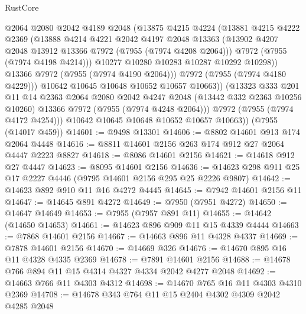 \begin{lexlean}{RustCore}
\begin{coremodule}
                  @2064
                  @2080
                  @2042
                  @4189
                  @2048
                  (@13875
                    @4215
                    @4224
                    (@13881
                      @4215
                      @4222
                      @2369
                      (@13888
                        @4214
                        @4221
                        @2042
                        @4197
                        @2048
                        @13363
                        (@13902 @4207 @2048 @13912 @13366 @7972 (@7955 (@7974 @4208 @2064)))
                        @7972
                        (@7955 (@7974 @4198 @4214)))
                      @10277
                      @10280
                      @10283
                      @10287
                      @10292
                      @10298))
                  @13366
                  @7972
                  (@7955 (@7974 @4190 @2064)))
                @7972
                (@7955 (@7974 @4180 @4229)))
              @10642
              @10645
              @10648
              @10652
              @10657
              @10663))
          (@13323
            @333
            @201
            @11
            @14
            @2363
            @2064
            @2080
            @2042
            @4247
            @2048
            (@13442 @332 @2363 @10256 @10260)
            @13366
            @7972
            (@7955 (@7974 @4248 @2064)))
          @7972
          (@7955 (@7974 @4172 @4254)))
        @10642
        @10645
        @10648
        @10652
        @10657
        @10663))
    (@7955 (@14017 @459))
@14601 := @9498 @13301
@14606 := @8802 @14601 @913 @174 @2064 @4448
@14616 := @8811 @14601 @2156 @263 @174 @912 @27 @2064 @4447 @2223 @8827
@14618 := @8086 @14601 @2156
@14621 := @14618 @912 @27 @4447
@14623 := @8095 @14601 @2156
@14636 := @14623 @298 @911 @25 @17 @2227 @4446 (@9795 @14601 @2156 @295 @25 @2226 @9807)
@14642 := @14623 @892 @910 @11 @16 @4272 @4445
@14645 := @7942 @14601 @2156 @11
@14647 := @14645 @891 @4272
@14649 := @7950 (@7951 @4272)
@14650 := @14647 @14649
@14653 := @7955 (@7957 @891 @11)
@14655 := @14642 (@14650 @14653)
@14661 := @14623 @896 @909 @11 @15 @4339 @4444
@14663 := @7868 @14601 @2156
@14667 := @14663 @896 @11 @4328 @4337
@14669 := @7878 @14601 @2156
@14670 := @14669 @326
@14676 := @14670 @895 @16 @11 @4328 @4335 @2369
@14678 := @7891 @14601 @2156
@14688 := @14678 @766 @894 @11 @15 @4314 @4327 @4334 @2042 @4277 @2048
@14692 := @14663 @766 @11 @4303 @4312
@14698 := @14670 @765 @16 @11 @4303 @4310 @2369
@14708 := @14678 @343 @764 @11 @15 @2404 @4302 @4309 @2042 @4285 @2048

\end{coremodule}
\end{lexlean}
